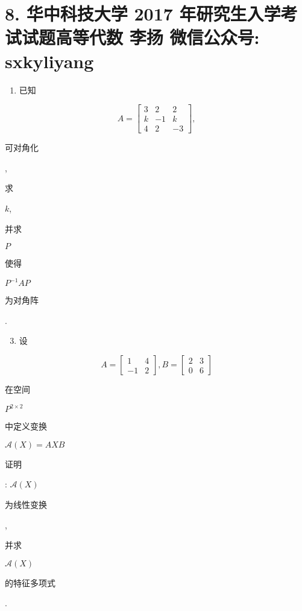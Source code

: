 \documentclass[10pt]{article}
\begin{document}
\section{8. 华中科技大学 2017 年研究生入学考试试题高等代数 
 李扬 
 微信公众号: sxkyliyang}
\begin{enumerate}
  \item \begin{CJK}{UTF8}{mj}已知\end{CJK}
\end{enumerate}
$$
A=\left[\begin{array}{ccc}
3 & 2 & 2 \\
k & -1 & k \\
4 & 2 & -3
\end{array}\right],
$$
\begin{CJK}{UTF8}{mj}可对角化\end{CJK}, \begin{CJK}{UTF8}{mj}求\end{CJK} $k$, \begin{CJK}{UTF8}{mj}并求\end{CJK} $P$ \begin{CJK}{UTF8}{mj}使得\end{CJK} $P^{-1} A P$ \begin{CJK}{UTF8}{mj}为对角阵\end{CJK}.

\begin{enumerate}
  \setcounter{enumi}{2}
  \item \begin{CJK}{UTF8}{mj}设\end{CJK}
\end{enumerate}
$$
A=\left[\begin{array}{cc}
1 & 4 \\
-1 & 2
\end{array}\right], B=\left[\begin{array}{ll}
2 & 3 \\
0 & 6
\end{array}\right]
$$
\begin{CJK}{UTF8}{mj}在空间\end{CJK} $P^{2 \times 2}$ \begin{CJK}{UTF8}{mj}中定义变换\end{CJK} $\mathscr{A}(X)=A X B$ \begin{CJK}{UTF8}{mj}证明\end{CJK}: $\mathscr{A}(X)$ \begin{CJK}{UTF8}{mj}为线性变换\end{CJK}, \begin{CJK}{UTF8}{mj}并求\end{CJK} $\mathscr{A}(X)$ \begin{CJK}{UTF8}{mj}的特征多项式\end{CJK}.
\end{document}
